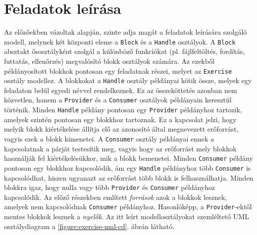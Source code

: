 \section{Feladatok leírása}
Az előzőekben vázoltak alapján, szinte adja magát a feladatok leírására szolgáló modell, melynek két központi eleme a \texttt{Block} és a \texttt{Handle} osztályok.
A \texttt{Block} absztakt ősosztályként szolgál a különböző funkciókat (pl. fájlfeltöltés, fordítás, futtatás, ellenőrzés) megvalósító blokk osztályok számára.
Az ezekből példányosított blokkok pontosan egy feladatnak részei, melyet az \texttt{Exercise} osztály modellez.
A blokkokat a \texttt{Handle} osztály példányai kötik össze, melyek egy feladaton belül egyedi névvel rendelkeznek.
Ez az összeköttetés azonban nem közvetlen, hanem a \texttt{Provider} és a \texttt{Consumer} osztályok példányain keresztül történik.
Minden \texttt{Handle} példány pontosan egy \texttt{Provider} példányhoz tartozik, amelyek szintén pontosan egy blokkhoz tartoznak.
Ez a kapcsolat jelzi, hogy melyik blokk kiértékelése állítja elő az azonosító által megnevezett erőforrást, vagyis ezek a blokk kimenetei.
A \texttt{Consumer} osztály példányai ennek a kapcsolatnak a párját testesítik meg, vagyis hogy az erőforrást mely blokkok használják fel kiértékelésükkor, mik a blokk bemenetei.
Minden \texttt{Consumer} példány pontosan egy blokkhoz kapcsolódik, ám egy \texttt{Handle} példányhoz több \texttt{Consumer} is kapcsolódhat, hiszen ugyanazt az erőforrást több blokk is felhasználhatja.
Minden blokkra igaz, hogy nulla vagy több \texttt{Provider} és \texttt{Consumer} példányhoz kapcsolódik.
Az előző részekben említett \textit{források} azok a blokkok lesznek, amelyek nem kapcsolódnak \texttt{Consumer} példányhoz.
Hasonlóképp, a \texttt{Provider}-ektől mentes blokkok lesznek a \textit{nyelők}.
Az itt leírt modellosztályokat szemléltető UML osztálydiagram a \ref{figure:exercise-uml-cd}. ábrán látható.

